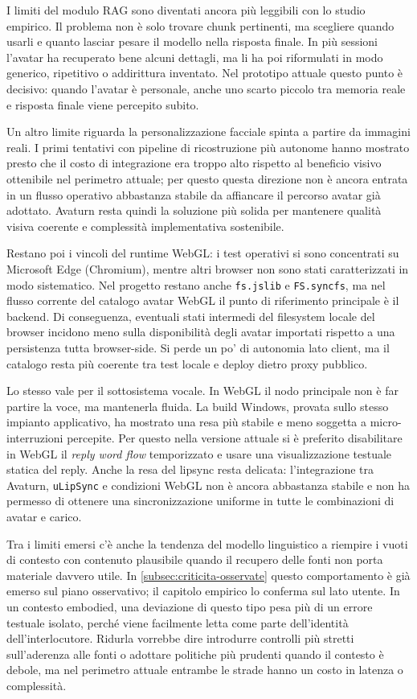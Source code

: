 I limiti del modulo RAG sono diventati ancora più leggibili con lo studio empirico. Il problema non è solo trovare chunk pertinenti, ma scegliere quando usarli e quanto lasciar pesare il modello nella risposta finale. In più sessioni l'avatar ha recuperato bene alcuni dettagli, ma li ha poi riformulati in modo generico, ripetitivo o addirittura inventato. Nel prototipo attuale questo punto è decisivo: quando l'avatar è personale, anche uno scarto piccolo tra memoria reale e risposta finale viene percepito subito.

Un altro limite riguarda la personalizzazione facciale spinta a partire da immagini reali. I primi tentativi con pipeline di ricostruzione più autonome hanno mostrato presto che il costo di integrazione era troppo alto rispetto al beneficio visivo ottenibile nel perimetro attuale; per questo questa direzione non è ancora entrata in un flusso operativo abbastanza stabile da affiancare il percorso avatar già adottato. Avaturn resta quindi la soluzione più solida per mantenere qualità visiva coerente e complessità implementativa sostenibile.

Restano poi i vincoli del runtime WebGL: i test operativi si sono concentrati su Microsoft Edge (Chromium), mentre altri browser non sono stati caratterizzati in modo sistematico. Nel progetto restano anche \texttt{fs.jslib} e \texttt{FS.syncfs}, ma nel flusso corrente del catalogo avatar WebGL il punto di riferimento principale è il backend. Di conseguenza, eventuali stati intermedi del filesystem locale del browser incidono meno sulla disponibilità degli avatar importati rispetto a una persistenza tutta browser-side. Si perde un po' di autonomia lato client, ma il catalogo resta più coerente tra test locale e deploy dietro proxy pubblico.

Lo stesso vale per il sottosistema vocale. In WebGL il nodo principale non è far partire la voce, ma mantenerla fluida. La build Windows, provata sullo stesso impianto applicativo, ha mostrato una resa più stabile e meno soggetta a micro-interruzioni percepite. Per questo nella versione attuale si è preferito disabilitare in WebGL il \emph{reply word flow} temporizzato e usare una visualizzazione testuale statica del reply. Anche la resa del lipsync resta delicata: l'integrazione tra Avaturn, \texttt{uLipSync} e condizioni WebGL non è ancora abbastanza stabile e non ha permesso di ottenere una sincronizzazione uniforme in tutte le combinazioni di avatar e carico.

Tra i limiti emersi c'è anche la tendenza del modello linguistico a riempire i vuoti di contesto con contenuto plausibile quando il recupero delle fonti non porta materiale davvero utile. In \autoref{subsec:criticita-osservate} questo comportamento è già emerso sul piano osservativo; il capitolo empirico lo conferma sul lato utente. In un contesto embodied, una deviazione di questo tipo pesa più di un errore testuale isolato, perché viene facilmente letta come parte dell'identità dell'interlocutore. Ridurla vorrebbe dire introdurre controlli più stretti sull'aderenza alle fonti o adottare politiche più prudenti quando il contesto è debole, ma nel perimetro attuale entrambe le strade hanno un costo in latenza o complessità.

